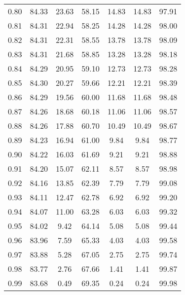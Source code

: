 \begin{tabular}{|c|c|c|c|c|c|c|}
      0.80 &     84.33 &     23.63 &      58.15 &   14.83 &      14.83 &         97.91 \\
      0.81 &     84.31 &     22.94 &      58.25 &   14.28 &      14.28 &         98.00 \\
      0.82 &     84.31 &     22.31 &      58.55 &   13.78 &      13.78 &         98.09 \\
      0.83 &     84.31 &     21.68 &      58.85 &   13.28 &      13.28 &         98.18 \\
      0.84 &     84.29 &     20.95 &      59.10 &   12.73 &      12.73 &         98.28 \\
      0.85 &     84.30 &     20.27 &      59.66 &   12.21 &      12.21 &         98.39 \\
      0.86 &     84.29 &     19.56 &      60.00 &   11.68 &      11.68 &         98.48 \\
      0.87 &     84.26 &     18.68 &      60.18 &   11.06 &      11.06 &         98.57 \\
      0.88 &     84.26 &     17.88 &      60.70 &   10.49 &      10.49 &         98.67 \\
      0.89 &     84.23 &     16.94 &      61.00 &    9.84 &       9.84 &         98.77 \\
      0.90 &     84.22 &     16.03 &      61.69 &    9.21 &       9.21 &         98.88 \\
      0.91 &     84.20 &     15.07 &      62.11 &    8.57 &       8.57 &         98.98 \\
      0.92 &     84.16 &     13.85 &      62.39 &    7.79 &       7.79 &         99.08 \\
      0.93 &     84.11 &     12.47 &      62.78 &    6.92 &       6.92 &         99.20 \\
      0.94 &     84.07 &     11.00 &      63.28 &    6.03 &       6.03 &         99.32 \\
      0.95 &     84.02 &      9.42 &      64.14 &    5.08 &       5.08 &         99.44 \\
      0.96 &     83.96 &      7.59 &      65.33 &    4.03 &       4.03 &         99.58 \\
      0.97 &     83.88 &      5.28 &      67.05 &    2.75 &       2.75 &         99.74 \\
      0.98 &     83.77 &      2.76 &      67.66 &    1.41 &       1.41 &         99.87 \\
      0.99 &     83.68 &      0.49 &      69.35 &    0.24 &       0.24 &         99.98 \\
\bottomrule
\end{tabular}

